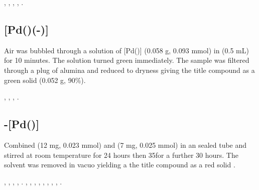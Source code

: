 ,
,
,
,
.

\subsection*{[Pd(\tButhixantphos)(-)]}

Air was bubbled through a solution of [Pd(\tButhixantphos)] (0.058 g, 0.093 mmol) in  (0.5 mL) for 10 minutes.  The solution turned green immediately.  The sample was filtered through a plug of alumina and reduced to dryness giving the title compound as a green solid (0.052 g, 90\%).

,
,
,
.

\subsection*{\trans{}-[Pd(\tBusixantphos)]}


Combined \tBusixantphos{} (12 mg, 0.023 mmol) and \ce{[Pd(COD)Cl2]} (7 mg, 0.025 mmol) in an sealed tube and stirred at room temperature for 24 hours then 35\degC for a further 30 hours.  The solvent was removed in vacuo yielding a the title compound as a red solid .

,
,
,
,
.
,
,
,
,
,
,
,
,
.

